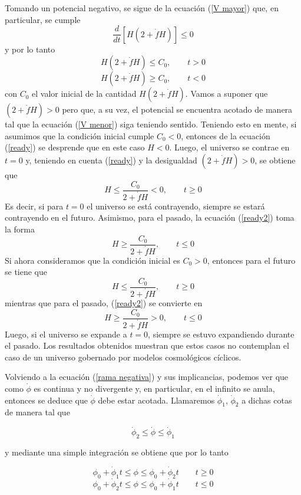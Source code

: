 Tomando un potencial negativo, se sigue de la ecuación (\ref{V mayor}) que, en particular, se cumple
$$
\frac{d}{dt}[H(2+\dot{f}H)] \leq 0
$$
y por lo tanto
\begin{equation}\label{ready}
H(2+\dot{f}H)\leq C_0,\qquad t>0
\end{equation}
\begin{equation}\label{ready2}
H(2+\dot{f}H)\geq C_0,\qquad t<0
\end{equation}
con $C_0$ el valor inicial de la cantidad $H(2+\dot{f}H)$. Vamos a suponer que $(2+\dot{f}H)>0$ pero que, a su vez, el potencial se encuentra acotado de manera tal que la ecuación (\ref{V menor}) siga teniendo sentido. Teniendo esto en mente, si asumimos que la condición inicial cumple $C_{0}< 0$, entonces de la ecuación (\ref{ready}) se desprende que en este caso $H<0$. Luego, el universo se contrae en $t=0$ y, teniendo en cuenta (\ref{ready}) y la desigualdad $(2+\dot{f}H)>0$, se obtiene que
$$
H\leq\frac{C_0}{2+\dot{f}H}<0,\qquad t\geq0
$$
Es decir, si para $t=0$ el universo se está contrayendo, siempre se estará contrayendo en el futuro. Asimismo, para el pasado, la ecuación (\ref{ready2}) toma la forma
$$
H\geq \frac{C_0}{2+\dot{f}H},\qquad t\leq0
$$
Si ahora consideramos que la condición inicial es $C_{0}> 0$, entonces para el futuro se tiene que
$$
H\leq \frac{C_0}{2+\dot{f}H},\qquad t\geq0
$$
mientras que para el pasado, (\ref{ready2}) se convierte en
$$
H\geq \frac{C_0}{2+\dot{f}H}> 0,\qquad t\leq0
$$
Luego, si el universo se expande a $t=0$, siempre se estuvo expandiendo durante el pasado. Los resultados obtenidos muestran que estos casos no contemplan el caso de un universo gobernado por modelos cosmológicos cíclicos.


Volviendo a la ecuación (\ref{rama negativa}) y sus implicancias, podemos ver que como $\dot{\phi}$ es continua y no divergente y, en particular, en el infinito se anula, entonces se deduce que $\dot{\phi}$ debe estar acotada. Llamaremos $\dot{\phi}_1$, $\dot{\phi}_2$ a dichas cotas de manera tal que

$$
\dot{\phi}_2\leq\dot{\phi}\leq\dot{\phi}_1
$$

y mediante una simple integración se obtiene que por lo tanto

$$
\phi_0+\dot{\phi}_1t\leq\phi\leq\phi_0+\dot{\phi}_2t\qquad t\geq 0
$$
\begin{equation}\label{bondo}
\phi_0+\dot{\phi}_2 t\leq\phi\leq\phi_0+\dot{\phi}_1t\qquad t\leq 0
\end{equation}

